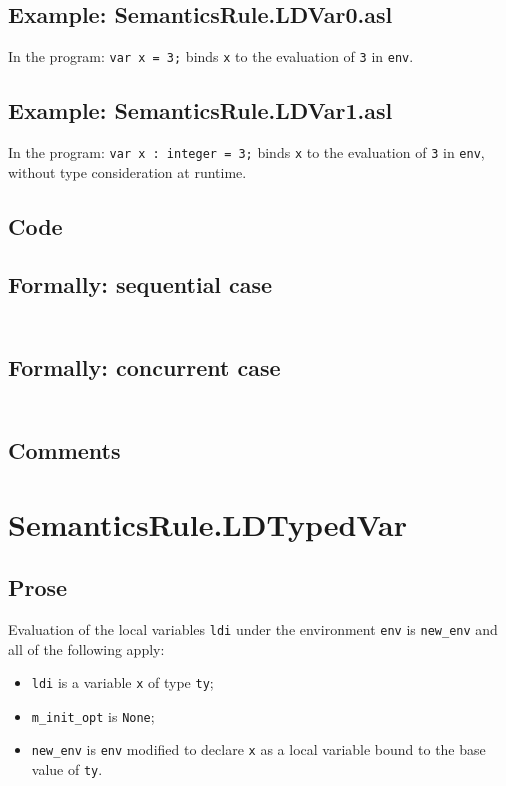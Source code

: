 \documentclass{book}
\begin{document}
    \subsection{Example: SemanticsRule.LDVar0.asl}
    In the program:
    \texttt{var x = 3;} binds \texttt{x} to the evaluation of \texttt{3} in \texttt{env}.

    \subsection{Example: SemanticsRule.LDVar1.asl}
    In the program:
    \texttt{var x : integer = 3;} binds \texttt{x} to the evaluation of
\texttt{3} in \texttt{env}, without type consideration at runtime.

  \subsection{Code}

  \subsection{Formally: sequential case}
  \begin{align}
  \end{align} 

  \subsection{Formally: concurrent case}
  \begin{align}
  \end{align} 

    \subsection{Comments}

\section{SemanticsRule.LDTypedVar \label{sec:SemanticsRule.LDTypedVar}}

    \subsection{Prose}
Evaluation of the local variables \texttt{ldi} under the environment
\texttt{env} is \texttt{new\_env} and all of the following apply:
    \begin{itemize}
    \item \texttt{ldi} is a variable \texttt{x} of type \texttt{ty};
    \item \texttt{m\_init\_opt} is \texttt{None};
    \item \texttt{new\_env} is \texttt{env} modified to declare \texttt{x} as a local variable bound to
      the base value of \texttt{ty}.
    \end{itemize}
\end{document}
